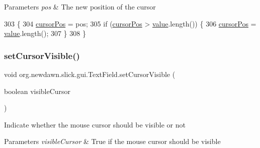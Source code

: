 \begin{DoxyParams}{Parameters}
{\em pos} & The new position of the cursor \\
\hline
\end{DoxyParams}

\begin{DoxyCode}
303                                       \{
304         \mbox{\hyperlink{classorg_1_1newdawn_1_1slick_1_1gui_1_1_text_field_a05994000bb672a1f49a9a8ee30ced3e5}{cursorPos}} = pos;
305         \textcolor{keywordflow}{if} (\mbox{\hyperlink{classorg_1_1newdawn_1_1slick_1_1gui_1_1_text_field_a05994000bb672a1f49a9a8ee30ced3e5}{cursorPos}} > \mbox{\hyperlink{classorg_1_1newdawn_1_1slick_1_1gui_1_1_text_field_a23c571aa0aa30ccbc28a090a06a444b7}{value}}.length()) \{
306             \mbox{\hyperlink{classorg_1_1newdawn_1_1slick_1_1gui_1_1_text_field_a05994000bb672a1f49a9a8ee30ced3e5}{cursorPos}} = \mbox{\hyperlink{classorg_1_1newdawn_1_1slick_1_1gui_1_1_text_field_a23c571aa0aa30ccbc28a090a06a444b7}{value}}.length();
307         \}
308     \}
\end{DoxyCode}
\mbox{\label{classorg_1_1newdawn_1_1slick_1_1gui_1_1_text_field_a4eb4665c2c85367c2ab3fbe4c5be62b8}} 
\subsubsection{\texorpdfstring{set\+Cursor\+Visible()}{setCursorVisible()}}
{\footnotesize\ttfamily void org.\+newdawn.\+slick.\+gui.\+Text\+Field.\+set\+Cursor\+Visible (\begin{DoxyParamCaption}\item[{boolean}]{visible\+Cursor }\end{DoxyParamCaption})\hspace{0.3cm}{\ttfamily [inline]}}

Indicate whether the mouse cursor should be visible or not


\begin{DoxyParams}{Parameters}
{\em visible\+Cursor} & True if the mouse cursor should be visible \\
\hline
\end{DoxyParams}

